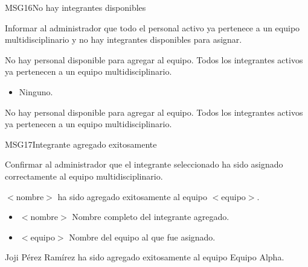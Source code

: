 \begin{cdtMessage}[msgWarningColor]{MSG16}{No hay integrantes disponibles}
	\item[Propósito:] Informar al administrador que todo el 
	personal activo ya pertenece a un equipo multidisciplinario 
	y no hay integrantes disponibles para asignar.
	\item[Redacción:] No hay personal disponible para agregar 
	al equipo. Todos los integrantes activos ya pertenecen 
	a un equipo multidisciplinario.
	\item[Parámetros:] \hspace{1cm}
	\begin{itemize}
		\item Ninguno.
	\end{itemize}
	\item[Ejemplos:] No hay personal disponible para agregar 
	al equipo. Todos los integrantes activos ya pertenecen 
	a un equipo multidisciplinario.
\end{cdtMessage}

\begin{cdtMessage}[msgInfoColor]{MSG17}{Integrante agregado exitosamente}
	\item[Propósito:] Confirmar al administrador que el integrante 
	seleccionado ha sido asignado correctamente al equipo 
	multidisciplinario.
	\item[Redacción:] $<$nombre$>$ ha sido agregado exitosamente 
	al equipo $<$equipo$>$.
	\item[Parámetros:] \hspace{1cm}
	\begin{itemize}
		\item $<$nombre$>$ Nombre completo del integrante agregado.
		\item $<$equipo$>$ Nombre del equipo al que fue asignado.
	\end{itemize}
	\item[Ejemplos:] Joji Pérez Ramírez ha sido agregado 
	exitosamente al equipo Equipo Alpha.
\end{cdtMessage}


